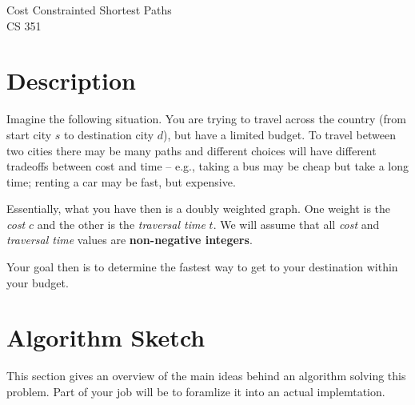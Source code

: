 
 
%
 
\setlength{\oddsidemargin}{0.260in}
\setlength{\evensidemargin}{0.260in}
\setlength{\topmargin}{-0.20in}
 
 
\setlength{\textheight}{9.0in}
\setlength{\textwidth}{6.5in}
\renewcommand{\baselinestretch}{1.00}
\newtheorem{theorem}{Theorem}[section]
\newtheorem{algorithm}{Algorithm}[section]
\newtheorem{lemma}{Lemma}[section]
\newtheorem{observation}{Observation}[section]
\newtheorem{property}{Property}[section]
\newtheorem{problem}{Problem}[section]
\newtheorem{definition}{Definition}[section]
\newtheorem{remark}{Remark}[section]
 

 
\pagestyle{empty}


\begin{center}
             {\Large Cost Constrainted Shortest
		Paths }\\
		CS 351\\
\end{center}

\section{Description}
Imagine the following situation.  You are trying to travel
across the country (from start city $s$ to destination city $d$), 
but have a limited budget.  To
travel between two cities there may be many paths and different
choices will have different tradeoffs between cost and time --
e.g., taking a bus may be cheap but take a long time; 
renting a car may be fast, but expensive.

Essentially, what you have then is a doubly weighted graph.
One weight is the {\em cost} $c$ and the other is the {\em traversal time}
$t$.  We will assume that 
all {\em cost} and {\em traversal time} values are 
{\bf non-negative integers}.

Your goal then is to determine the fastest way to get to your destination
within your budget.


\section{Algorithm Sketch}
This section gives an overview of the main ideas behind an
algorithm solving this problem.  Part of your job will be to foramlize
it into an actual implemtation.

